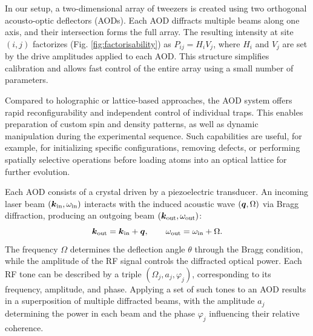 In our setup, a two-dimensional array of tweezers is created using two orthogonal acousto-optic deflectors (AODs). Each AOD diffracts multiple beams along one axis, and their intersection forms the full array. The resulting intensity at site $(i,j)$ factorizes (Fig. \ref{fig:factorisability}) as $P_{ij} = H_i V_j$, where $H_i$ and $V_j$ are set by the drive amplitudes applied to each AOD. This structure simplifies calibration and allows fast control of the entire array using a small number of parameters.

Compared to holographic or lattice-based approaches, the AOD system offers rapid reconfigurability and independent control of individual traps. This enables preparation of custom spin and density patterns, as well as dynamic manipulation during the experimental sequence. Such capabilities are useful, for example, for initializing specific configurations, removing defects, or performing spatially selective operations before loading atoms into an optical lattice for further evolution.

Each AOD consists of a crystal driven by a piezoelectric transducer. An incoming laser beam $(\boldsymbol{k}_{\mathrm{in}}, \omega_{\mathrm{in}})$ interacts with the induced acoustic wave $(\boldsymbol{q}, \Omega)$ via Bragg diffraction, producing an outgoing beam $(\boldsymbol{k}_{\mathrm{out}}, \omega_{\mathrm{out}})$:
\begin{equation*}
    \boldsymbol{k}_{\mathrm{out}} = \boldsymbol{k}_{\mathrm{in}} + \boldsymbol{q}, \qquad \omega_{\mathrm{out}} = \omega_{\mathrm{in}} + \Omega.
\end{equation*}
The frequency $\Omega$ determines the deflection angle $\theta$ through the Bragg condition, while the amplitude of the RF signal controls the diffracted optical power. Each RF tone can be described by a triple $(\Omega_j, a_j, \varphi_j)$, corresponding to its frequency, amplitude, and phase. Applying a set of such tones to an AOD results in a superposition of multiple diffracted beams, with the amplitude $a_j$ determining the power in each beam and the phase $\varphi_j$ influencing their relative coherence.



